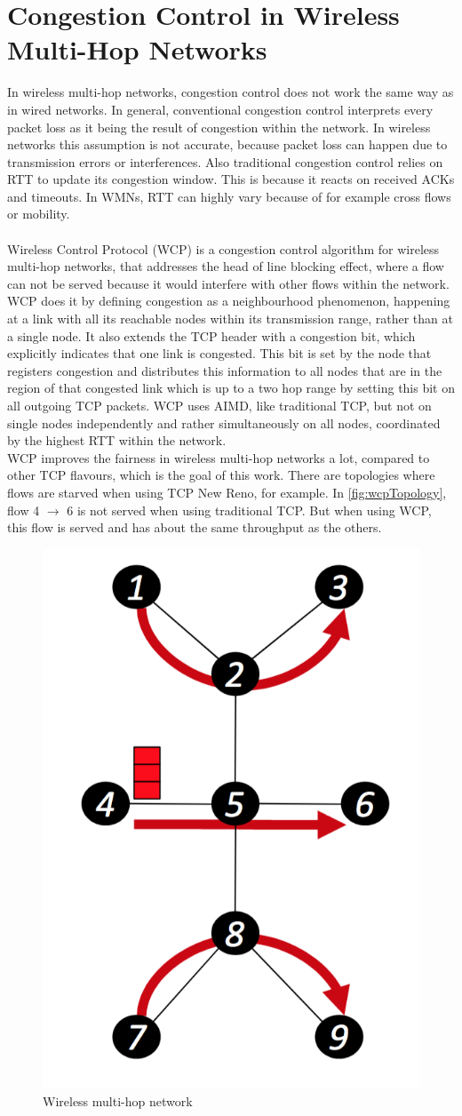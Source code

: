 \section{Congestion Control in Wireless Multi-Hop Networks}
\label{sec:rel_cong_control}
In wireless multi-hop networks, congestion control does not work the same way as in wired networks. In general, conventional congestion control interprets every packet loss as it being the result of congestion within the network. In wireless networks this assumption is not accurate, because packet loss can happen due to transmission errors or interferences. Also traditional congestion control relies on \gls{RTT} to update its congestion window. This is because it reacts on received ACKs and timeouts. In \gls{WMN}s, RTT can highly vary because of for example cross flows or mobility. \\ \\
Wireless Control Protocol (WCP) \cite{wcp} is a congestion control algorithm for wireless multi-hop networks, that addresses the head of line blocking effect, where a flow can not be served because it would interfere with other flows within the network. WCP does it by defining congestion as a neighbourhood phenomenon, happening at a link with all its reachable nodes within its transmission range, rather than at a single node. It also extends the TCP header with a congestion bit, which explicitly indicates that one link is congested. This bit is set by the node that registers congestion and distributes this information to all nodes that are in the region of that congested link which is up to a two hop range by setting this bit on all outgoing TCP packets. WCP uses \gls{AIMD}, like traditional TCP, but not on single nodes independently and rather simultaneously on all nodes, coordinated by the highest RTT within the network. \\
WCP improves the fairness in wireless multi-hop networks a lot, compared to other TCP flavours, which is the goal of this work. There are topologies where flows are starved when using TCP New Reno, for example. In \autoref{fig:wcpTopology}, flow 4 $  \rightarrow $ 6 is not served when using traditional TCP. But when using WCP, this flow is served and has about the same throughput as the others.
\begin{figure}[h]
	\centering
	\includegraphics[width=0.45\linewidth]{wcpTopology}
	\caption{Wireless multi-hop network \cite{wcp}}
	\label{fig:wcpTopology}
\end{figure}
